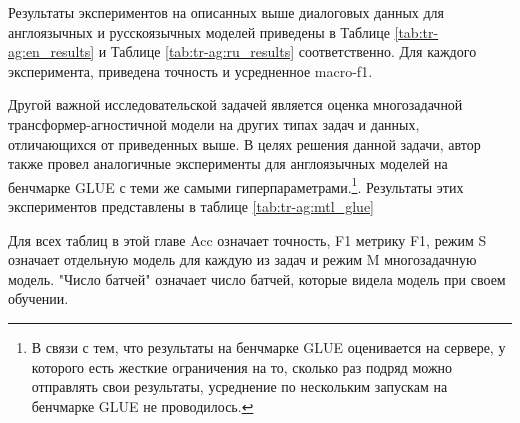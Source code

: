 Результаты экспериментов на описанных выше диалоговых данных для англоязычных и русскоязычных моделей приведены в Таблице \ref{tab:tr-ag:en_results} и Таблице \ref{tab:tr-ag:ru_results} соответственно. Для каждого эксперимента, приведена точность и усредненное macro-f1.

Другой важной исследовательской задачей является оценка многозадачной трансформер-агностичной модели на других типах задач и данных, отличающихся от приведенных выше. В целях решения данной задачи, автор также провел аналогичные эксперименты для англоязычных моделей на бенчмарке GLUE\cite{wang_2018} с теми же самыми гиперпараметрами.\footnote{В связи с тем, что результаты на бенчмарке GLUE оценивается на сервере, у которого есть жесткие ограничения на то, сколько раз подряд можно отправлять свои результаты, усреднение по нескольким запускам на бенчмарке GLUE не проводилось.}. Результаты этих экспериментов представлены в таблице \ref{tab:tr-ag:mtl_glue}

Для всех таблиц в этой главе Acc означает точность, F1 метрику F1, режим S означает отдельную модель для каждую из задач и режим M многозадачную модель. "Число батчей" означает число батчей, которые видела модель при своем обучении.

\begin{table*}
 \caption{Метрики англоязычных моделей (точность/f1 macro) для пяти англоязычных диалоговых задач.Режим S означает однозадачные модели, режим M означает многозадачные модели. Усреднено по трем запускам.}
 \label{tab:tr-ag:en_results}
\centering
{}
\end{table*}
 
